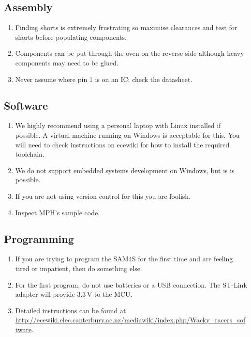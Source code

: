 \documentclass[11pt, a4paper]{article}
\begin{document}
\subsection{Assembly}

\begin{enumerate}
\item Finding shorts is extremely frustrating so maximise clearances
  and test for shorts before populating components.

\item Components can be put through the oven on the reverse side
  although heavy components may need to be glued.
  
\item Never assume where pin 1 is on an IC; check the datasheet.  
  
\end{enumerate}


\subsection{Software}

\begin{enumerate}
\item We highly recommend using a personal laptop with Linux installed if
possible. A virtual machine running on Windows is acceptable for this. You will
need to check instructions on ecewiki for how to install the required toolchain.

\item We do not support embedded systems development on Windows, but is is
possible.

\item If you are not using version control for this you are foolish.

\item Inspect MPH's sample code.

\end{enumerate}


\subsection{Programming}

\begin{enumerate}
\item If you are trying to program the SAM4S for the first time and
  are feeling tired or impatient, then do something else.

\item For the first program, do not use batteries or a USB connection.
  The ST-Link adapter will provide 3.3\,V to the MCU.
 
\item Detailed instructions can be found at
  \url{http://ecewiki.elec.canterbury.ac.nz/mediawiki/index.php/Wacky_racers_software}.
\end{enumerate}
\end{document}

